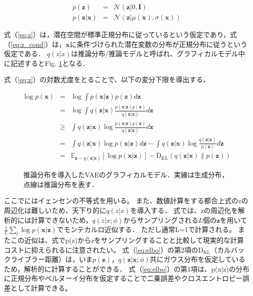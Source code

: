 \begin{eqnarray}
  p(\bm{z}) &=& \mathcal{N}(\bm{z}|0,\bm{I}) \label{eq:z}\\
  p(\bm{z}|\bm{x}) &=& \mathcal{N}(\bm{z}|\mu(\bm{x}),\sigma(\bm{x}))	\label{eq:z_cond}
\end{eqnarray}

式（\ref{eq:z}）は，潜在空間が標準正規分布に従っているという仮定であり，式（\ref{eq:z_cond}）は，$\bm{x}$に条件づけられた潜在変数の分布が正規分布に従うという仮定である．
$q(z|x)$は推論分布/推論モデルと呼ばれ、グラフィカルモデル中に記述するとFig. \ref{fig:vae_cond}となる．

式（\ref{eq:z}）の対数尤度をとることで、以下の変分下限を導出する、

\begin{eqnarray}
  \log p(\bm{x}) &=& \log \int p(\bm{x}|\bm{z}) p(\bm{z}) d\bm{z} \nonumber \\
  &=& \log \int q(\bm{z}|\bm{x}) \frac{p(\bm{x}|\bm{z}) p(\bm{z})}{q(\bm{z}|\bm{x})} d\bm{z} \nonumber \\
  &\geq& \int q(\bm{z}|\bm{x}) \log \frac{p(\bm{x}|\bm{z}) p(\bm{z})}{q(\bm{z}|\bm{x})} d\bm{z} \label{eq:jensen}\\
  &=& \int q(\bm{z}|\bm{x}) \log p(\bm{x}|\bm{z}) d\bm{z} - \int q(\bm{z}|\bm{x}) \log \frac{q(\bm{z}|\bm{x})}{p(\bm{z})} d\bm{z} \nonumber \\
  &=& \mathbb{E}_{\bm{z} \sim q(\bm{z}|\bm{x})} [\log p(\bm{x}|\bm{z})] - \mathrm{D_{KL}}(q(\bm{z}|\bm{x}) \| p(\bm{z})) \label{eq:elbo}
\end{eqnarray}


\begin{figure}[bp]
  \begin{center}
    \caption{推論分布を導入したVAEのグラフィカルモデル．実線は生成分布，点線は推論分布を表す．}
    \label{fig:vae_cond}
  \end{center}
\end{figure}

ここでにはイェンセンの不等式を用いる。
また、数値計算をする都合上式のzの周辺化は難しいため、天下り的に$q(z|x)$を導入する．
式では、zの周辺化を解析的には計算できないため，$q(z|x; \phi)$からサンプリングされる$L$個の$\bm{z}$を用いて$\frac{1}{L} \sum_{l} \log p(\bm{x}|\bm{z})$でモンテカルロ近似する．
ただし通常L=1で計算される。
またこの近似は、式でp(z)からzをサンプリングすることと比較して現実的な計算コストに抑えられるに注意されたい。
式（\ref{eq:elbo}）の第2項の$\mathrm{D_{KL}}$（カルバックライブラー距離）は，いま$p(\bm{z})$，$q(\bm{z}|\bm{x}; \phi)$共にガウス分布を仮定しているため，解析的に計算することができる．
式（\ref{eq:elbo}）の第1項は、p(x|z)の分布に正規分布やベルヌーイ分布を仮定することで二乗誤差やクロスエントロピー誤差として計算できる。

